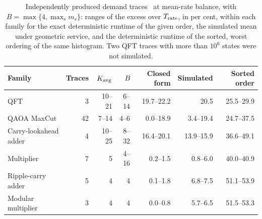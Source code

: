 \begin{table}[htbp]
\centering\small
\begin{tabular}{lrrrrrr}
\toprule
Family & Traces & $K_{\rm avg}$ & $B$ & Closed form & Simulated & Sorted order\\\midrule
QFT & 3 & 10--21 & 6--14 & 19.7--22.2 & 20.5 & 25.5--29.9\\
QAOA MaxCut & 42 & 7--14 & 4--6 & 0.0--18.9 & 3.4--19.4 & 24.7--37.5\\
Carry-lookahead adder & 4 & 10--25 & 8--32 & 16.4--20.1 & 13.9--15.9 & 36.6--49.1\\
Multiplier & 7 & 5 & 4--16 & 0.2--1.5 & 0.8--6.0 & 40.0--40.9\\
Ripple-carry adder & 5 & 4 & 4 & 0.1--1.8 & 6.8--7.5 & 51.1--53.9\\
Modular multiplier & 3 & 4 & 4 & 0.0--0.8 & 5.7--6.5 & 51.5--53.3\\
\bottomrule
\end{tabular}
\caption{Independently produced demand traces~\cite{ye2026} at mean-rate balance, with $B=\max\{4,\max_sm_s\}$: ranges of the excess over $T_{\rm rate}$, in per cent, within each family for the exact deterministic runtime of the given order, the simulated mean under geometric service, and the deterministic runtime of the sorted, worst ordering of the same histogram. Two QFT traces with more than $10^6$ states were not simulated.}
\label{tab:external}
\end{table}
